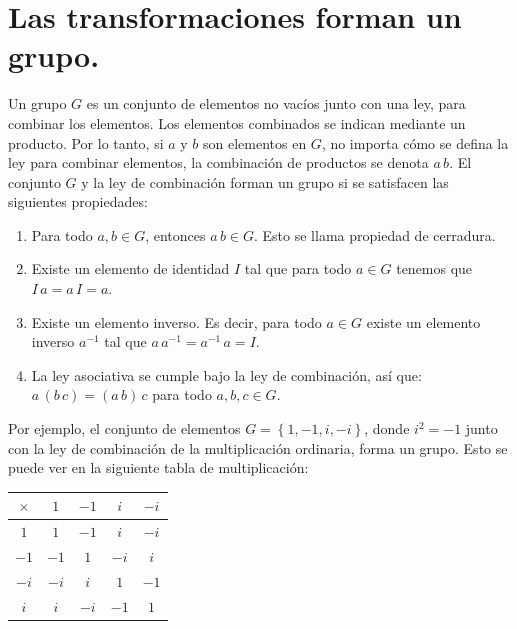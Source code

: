 \documentclass[hidelinks,12pt]{article}
\begin{document}
\section{Las transformaciones forman un grupo.}

Un grupo $G$ es un conjunto de elementos no vacíos junto con una ley, para combinar los elementos. Los elementos combinados se indican mediante un producto. Por lo tanto, si $a$ y $b$ son elementos en $G$, no importa cómo se defina la ley para combinar elementos, la combinación de productos se denota $a \, b$. El conjunto $G$ y la ley de combinación forman un grupo si se satisfacen las siguientes propiedades:
\begin{enumerate}[label= (\roman*)]
\item Para todo $a, b \in G$, entonces $a \, b \in G$. Esto se llama propiedad de cerradura.
\item Existe un elemento de identidad $I$ tal que para todo $a \in G$ tenemos que $I \, a = a \, I = a$.
\item Existe un elemento inverso. Es decir, para todo $a \in G$ existe un elemento inverso $a^{-1}$ tal que $a \, a^{-1} = a^{-1} \, a = I$.
\item La ley asociativa se cumple bajo la ley de combinación, así que: $a \, (b \, c) = (a \, b) \,  c$ para todo $a, b, c \in G$.
\end{enumerate}

Por ejemplo, el conjunto de elementos $G = \left\{ 1, -1, i, -i \right\}$, donde $i^{2} = -1$ junto con la ley de combinación de la multiplicación ordinaria, forma un grupo. Esto se puede ver en la siguiente tabla de multiplicación:
\begin{table}[H]
\centering
\begin{tabular}{| c | c | c | c | c |} \hline
$\times$ & $1$ & $-1$ & $i$ & $-i$ \\ \hline
$1$ & $1$ & $-1$ & $i$ & $-i$ \\ \hline
$-1$ & $-1$ & $1$ & $-i$ & $i$ \\ \hline
$-i$ & $-i$ & $i$ & $1$ & $-1$ \\ \hline
$i$ & $i$ & $-i$ & $-1$ & $1$ \\ \hline
\end{tabular}
\end{table}
\end{document}
